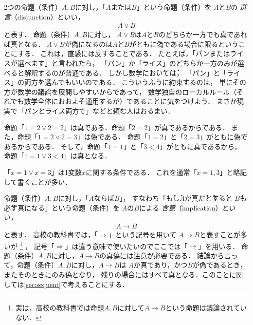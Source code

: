   2つの命題（条件）$A,  B$に対し，「$A$または$B$」という命題（条件）を
  $A$と$B$の
  \emph{選言}（disjunction）といい，
  \begin{align}
    A \lor B
    \label{eq:disjunction}
  \end{align}
  と表す．
  命題（条件）$A,  B$に対し，
  $A \lor B$は$A$と$B$のどちらか一方でも真であれば真となる．
  $A \lor B$が偽になるのは$A$と$B$がともに偽である場合に限るということにする．
  これは，直感には反することである．
  たとえば，「パンまたはライスが選べます」と言われたら，
  「パン」か「ライス」のどちらか一方のみが選べると解釈するのが普通である．
  しかし\.数\.学\.に\.お\.い\.て\.は，
  「パン」と「ライス」の両方を選んでもいいのである．
  こういうふうに約束するのは，
  単にその方が数学の議論を展開しやすいからであって，
  数学独自のローカルルール（それでも数学全体におおよそ通用するが）であることに気をつけよう．
  まさか現実で「パンとライス両方で」などと頼む人はおるまい．

  \begin{ex}
    命題「$1=2 \lor 2=2$」は真である．命題「$2=2$」が真であるからである．
    また，命題「$1=2 \lor 2=3$」は偽である．
    命題「$1=2$」と「$2=3$」がともに偽であるからである．
    そして，命題「$1=1$」と「$3<4$」がともに真であるから，
    命題「$1=1 \lor 3<4$」は真となる．

    「$x=1 \lor x=3$」は1変数$x$に関する条件である．
    これを通常「$x = 1, 3$」と略記して書くことが多い．
  \end{ex}

  命題（条件）$A,  B$に対し，「$A$ならば$B$」，
  すなわち「\.も\.し$A$が真\.だ\.と\.す\.ると
  $B$も\.必\.ず真になる」という命題（条件）を
  $A$の$B$による
  \emph{含意}（implication）といい，
  \begin{align}
    A \to B
    \label{eq:implication}
  \end{align}
  と表す．
  高校の教科書では，「$\Longrightarrow$」という記号を用いて
  $A \Longrightarrow B$と表すことが多いが
  \footnote{実は，高校の教科書では命題$A,B$に対して$A \to B$という命題は議論されていない．}
  ，
  記号「$\Longrightarrow$」は違う意味で使いたいのでここでは「$\to$」を用いる．
  命題（条件）$A,  B$に対し，$A \to B$の真偽には注意が必要である．
  結論から言って，命題（条件）$A,  B$に対し，$A \to B$は
  $A$が真であり，かつ$B$が偽であるとき，またそのときにのみ偽となり，
  残りの場合にはすべて真となる．このことに関しては\ref{sec:sequent}で考えることにする．

